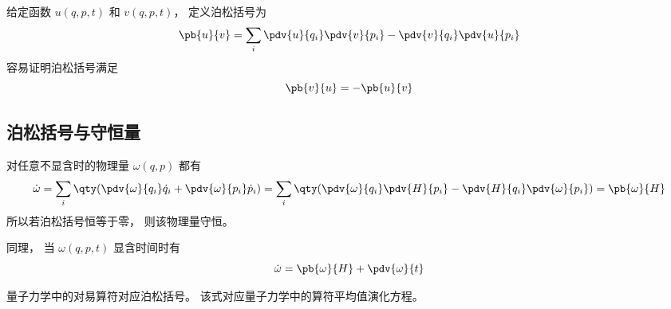
\begin{issues}
\issueDraft
\end{issues}


给定函数 $u(q, p, t)$ 和 $v(q, p, t)$， 定义泊松括号为
\begin{equation}
\pb{u}{v} = \sum_i \pdv{u}{q_i}\pdv{v}{p_i} - \pdv{v}{q_i}\pdv{u}{p_i}
\end{equation}
容易证明泊松括号满足
\begin{equation}
\pb{v}{u} = -\pb{u}{v}
\end{equation}

\subsection{泊松括号与守恒量}
对任意不显含时的物理量 $\omega (q,p)$ 都有
\begin{equation}\label{poison_eq1}
\dot \omega  = \sum_i \qty(\pdv{\omega}{q_i} \dot q_i + \pdv{\omega}{p_i} \dot p_i)
= \sum_i \qty(\pdv{\omega}{q_i} \pdv{H}{p_i} - \pdv{H}{q_i} \pdv{\omega}{p_i})
= \pb{\omega}{H} 
\end{equation}
所以若泊松括号恒等于零， 则该物理量守恒。

同理， 当 $\omega (q,p,t)$ 显含时间时有
\begin{equation}
\dot \omega  =  \pb{\omega}{H}  + \pdv{\omega}{t}
\end{equation}

量子力学中的对易算符对应泊松括号。 该式对应量子力学中的算符平均值演化方程。 %
